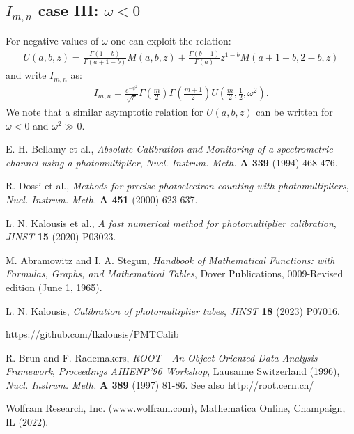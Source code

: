 \documentclass[preprint,12pt]{elsarticle}
\begin{document}
\subsection*{$I_{m,n}$ case III: $ \omega <0$}
%

For negative values of $\omega$ one can exploit the relation:
\begin{align}
U(a,b,z) = \frac{\Gamma(1-b) }{\Gamma(a+1-b)}M(a,b,z) + \frac{\Gamma(b-1) }{\Gamma(a)} z^{1-b} M(a+1-b, 2-b, z )
\end{align}
and write $I_{m,n}$ as:
\begin{align}
I_{m,n} = \frac{ e^{ -\psi^2 } }{ \sqrt{\pi} }\Gamma\left( \frac{m}{2} \right)   \Gamma\left( \frac{m+1}{2} \right) U\left( \frac{m}{2}, \frac{1}{2}, \omega^2  \right). 
\end{align}
We note that a similar  asymptotic relation for $U(a,b,z)$ can be written for $\omega<0$ and $\omega^2 \gg 0$. 




\begin{thebibliography}{00}


 E. H. Bellamy {et al.}, \emph{Absolute Calibration and Monitoring of a spectrometric channel using a photomultiplier}, 
\emph{Nucl. Instrum. Meth.} {\bf A 339} (1994) 468-476. 

  R. Dossi {et al.}, \emph{Methods for precise photoelectron counting with photomultipliers}, 
\emph{Nucl. Instrum. Meth.} {\bf A 451} (2000) 623-637.

 L. N. Kalousis {et al.}, \emph{A fast numerical method for photomultiplier calibration}, \emph{JINST} {\bf 15} (2020) P03023.

 M. Abramowitz and I. A. Stegun, \emph{Handbook of Mathematical Functions: with Formulas, Graphs, and Mathematical Tables}, Dover Publications, 0009-Revised edition (June 1, 1965).  

 L. N. Kalousis, \emph{Calibration of photomultiplier tubes}, \emph{JINST} {\bf 18} (2023) P07016.

 https://github.com/lkalousis/PMTCalib

 R. Brun and F. Rademakers, \emph{ROOT - An Object Oriented Data Analysis Framework}, \emph{Proceedings AIHENP'96 Workshop}, Lausanne Switzerland (1996),
{\emph{Nucl. Instrum. Meth.} {\bf A 389 } (1997) 81-86.} See also http://root.cern.ch/

 Wolfram Research, Inc. (www.wolfram.com), Mathematica Online, Champaign, IL (2022).


\end{thebibliography}
\end{document}
